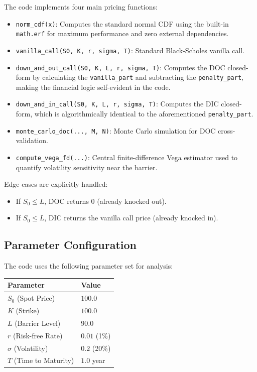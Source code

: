\documentclass{report}
\begin{document}
The code implements four main pricing functions:
\begin{itemize}
    \item \texttt{norm\_cdf(x)}: Computes the standard normal CDF using the built-in \texttt{math.erf} for maximum performance and zero external dependencies.
    \item \texttt{vanilla\_call(S0, K, r, sigma, T)}: Standard Black-Scholes vanilla call.
    \item \texttt{down\_and\_out\_call(S0, K, L, r, sigma, T)}: Computes the DOC closed-form by calculating the \texttt{vanilla\_part} and subtracting the \texttt{penalty\_part}, making the financial logic self-evident in the code.
    \item \texttt{down\_and\_in\_call(S0, K, L, r, sigma, T)}: Computes the DIC closed-form, which is algorithmically identical to the aforementioned \texttt{penalty\_part}.
    \item \texttt{monte\_carlo\_doc(..., M, N)}: Monte Carlo simulation for DOC cross-validation.
    \item \texttt{compute\_vega\_fd(...)}: Central finite-difference Vega estimator used to quantify volatility sensitivity near the barrier.
\end{itemize}

Edge cases are explicitly handled:
\begin{itemize}
    \item If $S_0 \le L$, DOC returns 0 (already knocked out).
    \item If $S_0 \le L$, DIC returns the vanilla call price (already knocked in).
\end{itemize}

\subsection{Parameter Configuration}
The code uses the following parameter set for analysis:
\begin{center}
\begin{tabular}{ll}
\toprule
\textbf{Parameter} & \textbf{Value} \\
\midrule
$S_0$ (Spot Price) & $100.0$ \\
$K$ (Strike) & $100.0$ \\
$L$ (Barrier Level) & $90.0$ \\
$r$ (Risk-free Rate) & $0.01$ (1\%) \\
$\sigma$ (Volatility) & $0.2$ (20\%) \\
$T$ (Time to Maturity) & $1.0$ year \\
\bottomrule
\end{tabular}
\end{center}
\end{document}
